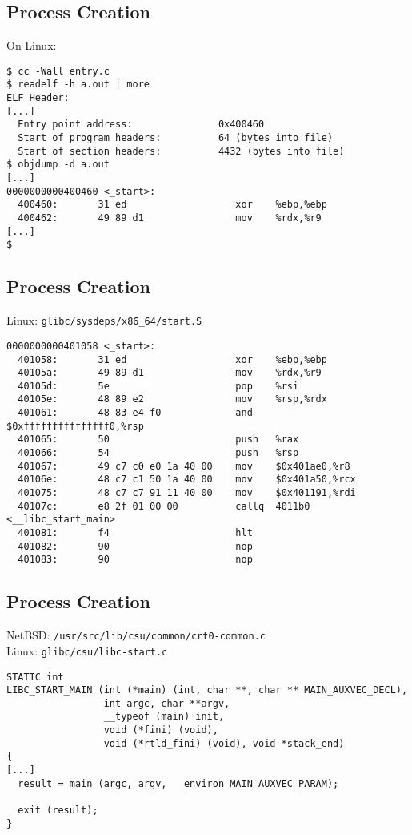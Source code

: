 \documentclass[xga]{xdvislides}
\begin{document}
\subsection{Process Creation}
On Linux:
\begin{verbatim}
$ cc -Wall entry.c
$ readelf -h a.out | more
ELF Header:
[...]
  Entry point address:               0x400460
  Start of program headers:          64 (bytes into file)
  Start of section headers:          4432 (bytes into file)
$ objdump -d a.out
[...]
0000000000400460 <_start>:
  400460:       31 ed                   xor    %ebp,%ebp
  400462:       49 89 d1                mov    %rdx,%r9
[...]
$
\end{verbatim}

\subsection{Process Creation}
Linux: \verb+glibc/sysdeps/x86_64/start.S+

\begin{verbatim}
0000000000401058 <_start>:
  401058:       31 ed                   xor    %ebp,%ebp
  40105a:       49 89 d1                mov    %rdx,%r9
  40105d:       5e                      pop    %rsi
  40105e:       48 89 e2                mov    %rsp,%rdx
  401061:       48 83 e4 f0             and    $0xfffffffffffffff0,%rsp
  401065:       50                      push   %rax
  401066:       54                      push   %rsp
  401067:       49 c7 c0 e0 1a 40 00    mov    $0x401ae0,%r8
  40106e:       48 c7 c1 50 1a 40 00    mov    $0x401a50,%rcx
  401075:       48 c7 c7 91 11 40 00    mov    $0x401191,%rdi
  40107c:       e8 2f 01 00 00          callq  4011b0 <__libc_start_main>
  401081:       f4                      hlt
  401082:       90                      nop
  401083:       90                      nop
\end{verbatim}

\subsection{Process Creation}
NetBSD: \verb+/usr/src/lib/csu/common/crt0-common.c+ \\

Linux: \verb+glibc/csu/libc-start.c+

\begin{verbatim}
STATIC int
LIBC_START_MAIN (int (*main) (int, char **, char ** MAIN_AUXVEC_DECL),
                 int argc, char **argv,
                 __typeof (main) init,
                 void (*fini) (void),
                 void (*rtld_fini) (void), void *stack_end)
{
[...]
  result = main (argc, argv, __environ MAIN_AUXVEC_PARAM);

  exit (result);
}
\end{verbatim}
\end{document}
